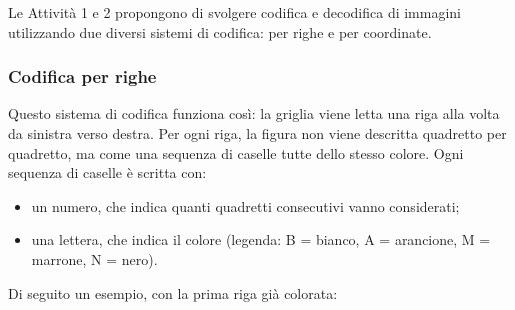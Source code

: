Le Attività 1 e 2 propongono di svolgere codifica e decodifica di immagini utilizzando due diversi sistemi di codifica: per righe e per coordinate.

\subsubsection{Codifica per righe}

Questo sistema di codifica funziona così: la griglia viene letta una riga alla volta da sinistra verso destra. Per ogni riga, la figura non viene descritta quadretto per quadretto, ma come una sequenza di caselle tutte dello stesso colore. Ogni sequenza di caselle è scritta con:

\begin{itemize}
\item
  un numero, che indica quanti quadretti consecutivi vanno considerati;
\item
  una lettera, che indica il colore (legenda: B = bianco, A = arancione, M = marrone, N = nero).
\end{itemize}

Di seguito un esempio, con la prima riga già colorata:


